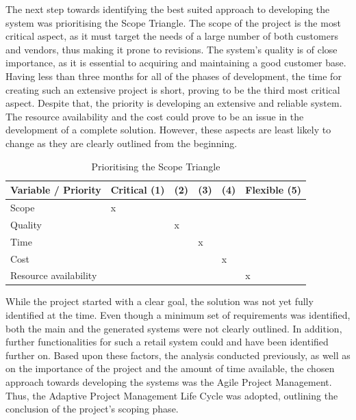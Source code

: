 The next step towards identifying the best suited approach to developing the system was prioritising the Scope Triangle. The scope of the project is the most critical aspect, as it must target the needs of a large number of both customers and vendors, thus making it prone to revisions. The system's quality is of close importance, as it is essential to acquiring and maintaining a good customer base. Having less than three months for all of the phases of development, the time for creating such an extensive project is short, proving to be the third most critical aspect. Despite that, the priority is developing an extensive and reliable system. The resource availability and the cost could prove to be an issue in the development of a complete solution. However, these aspects are least likely to change as they are clearly outlined from the beginning.\\

\begin{table}[t]
\centering
    \begin{tabular}{ | l | p{1.2cm} | p{1.2cm} | p{1.2cm} | p{1.2cm} | p{1.2cm} |}
    \hline
    Variable / Priority & Critical (1) & (2) & (3) & (4) & Flexible (5) \\ \hline
    Scope & x &  &  &  &  \\ \hline
    Quality &  & x &  &  &  \\ \hline
    Time &  &  & x &  &  \\ \hline
    Cost &  &  &  & x &  \\ \hline
    Resource availability &  &  &  &  & x \\
    \hline
    \end{tabular}
 \caption{Prioritising the Scope Triangle}
\label{tab:scope_triangle}
\end{table}

While the project started with a clear goal, the solution was not yet fully identified at the time. Even though a minimum set of requirements was identified, both the main and the generated systems were not clearly outlined. In addition, further functionalities for such a retail system could and have been identified further on. Based upon these factors, the analysis conducted previously, as well as on the importance of the project and the amount of time available, the chosen approach towards developing the systems was the Agile Project Management. Thus, the Adaptive Project Management Life Cycle was adopted, outlining the conclusion of the project's scoping phase. 

